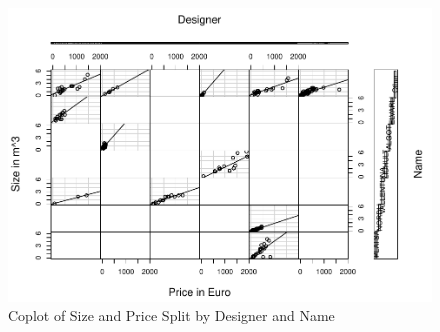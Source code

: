 \documentclass[a4paper, nobind]{templates/ociamthesis}
\begin{document}
\begin{figure}[!h]
\includegraphics[width=1\linewidth]{_main_files/figure-latex/coplot-code-designer-name-1} \caption{Coplot of Size and Price Split by Designer and Name}\label{fig:coplot-code-designer-name}
\end{figure}
\end{document}
